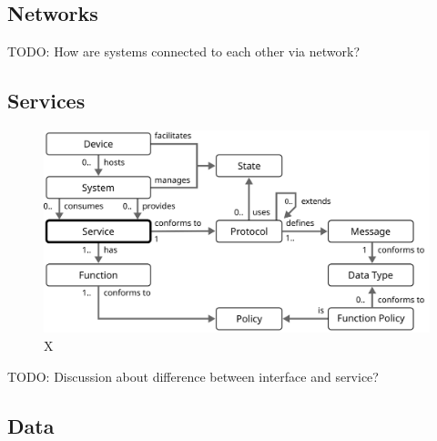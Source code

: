 \subsection{Networks}

TODO: How are systems connected to each other via network?

\subsection{Services}

\begin{figure}[ht!]
  \centering
  \includegraphics{figures/service}
  \caption{
    X
  }
  \label{fig:service}
\end{figure}

TODO: Discussion about difference between interface and service?

\subsection{Data}

